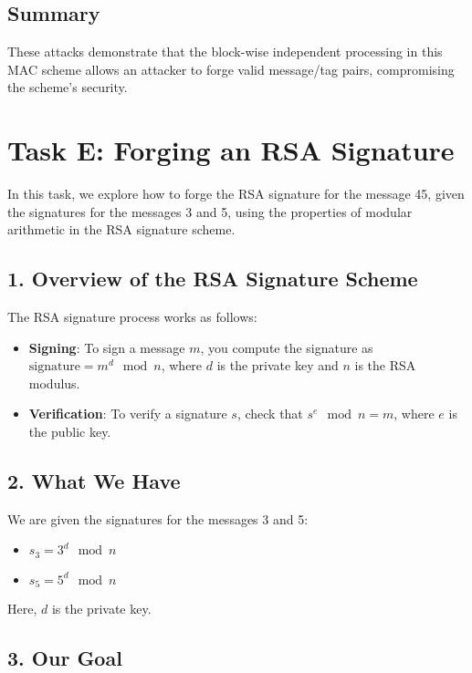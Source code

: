 \documentclass[12pt]{article}
\begin{document}
\subsection*{Summary}

These attacks demonstrate that the block-wise independent processing in this MAC scheme allows an attacker to forge valid message/tag pairs, compromising the scheme's security.


\section{Task E: Forging an RSA Signature}

In this task, we explore how to forge the RSA signature for the message 45, given the signatures for the messages 3 and 5, using the properties of modular arithmetic in the RSA signature scheme.

\subsection*{1. Overview of the RSA Signature Scheme}

The RSA signature process works as follows:
\begin{itemize}
    \item \textbf{Signing}: To sign a message \( m \), you compute the signature as \( \text{signature} = m^d \mod n \), where \( d \) is the private key and \( n \) is the RSA modulus.
    \item \textbf{Verification}: To verify a signature \( s \), check that \( s^e \mod n = m \), where \( e \) is the public key.
\end{itemize}

\subsection*{2. What We Have}

We are given the signatures for the messages 3 and 5:
\begin{itemize}
    \item \( s_3 = 3^d \mod n \)
    \item \( s_5 = 5^d \mod n \)
\end{itemize}
Here, \( d \) is the private key.

\subsection*{3. Our Goal}
\end{document}
